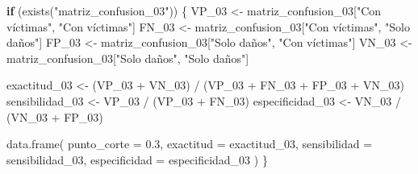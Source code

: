 \documentclass[
  11pt,
  letterpaper,
]{book}
\newenvironment{Shaded}{\begin{snugshade}}{\end{snugshade}}
\newcommand{\AttributeTok}[1]{\textcolor[rgb]{0.40,0.45,0.13}{#1}}
\newcommand{\ControlFlowTok}[1]{\textcolor[rgb]{0.00,0.23,0.31}{\textbf{#1}}}
\newcommand{\FloatTok}[1]{\textcolor[rgb]{0.68,0.00,0.00}{#1}}
\newcommand{\FunctionTok}[1]{\textcolor[rgb]{0.28,0.35,0.67}{#1}}
\newcommand{\NormalTok}[1]{\textcolor[rgb]{0.00,0.23,0.31}{#1}}
\newcommand{\OtherTok}[1]{\textcolor[rgb]{0.00,0.23,0.31}{#1}}
\newcommand{\SpecialCharTok}[1]{\textcolor[rgb]{0.37,0.37,0.37}{#1}}
\newcommand{\StringTok}[1]{\textcolor[rgb]{0.13,0.47,0.30}{#1}}
\begin{document}
\begin{Shaded}
\end{Shaded}

\begin{Shaded}
\begin{Highlighting}[]
\ControlFlowTok{if}\NormalTok{ (}\FunctionTok{exists}\NormalTok{(}\StringTok{"matriz\_confusion\_03"}\NormalTok{)) \{}
\NormalTok{  VP\_03 }\OtherTok{\textless{}{-}}\NormalTok{ matriz\_confusion\_03[}\StringTok{"Con víctimas"}\NormalTok{, }\StringTok{"Con víctimas"}\NormalTok{]}
\NormalTok{  FN\_03 }\OtherTok{\textless{}{-}}\NormalTok{ matriz\_confusion\_03[}\StringTok{"Con víctimas"}\NormalTok{, }\StringTok{"Solo daños"}\NormalTok{]}
\NormalTok{  FP\_03 }\OtherTok{\textless{}{-}}\NormalTok{ matriz\_confusion\_03[}\StringTok{"Solo daños"}\NormalTok{, }\StringTok{"Con víctimas"}\NormalTok{]}
\NormalTok{  VN\_03 }\OtherTok{\textless{}{-}}\NormalTok{ matriz\_confusion\_03[}\StringTok{"Solo daños"}\NormalTok{, }\StringTok{"Solo daños"}\NormalTok{]}

\NormalTok{  exactitud\_03 }\OtherTok{\textless{}{-}}\NormalTok{ (VP\_03 }\SpecialCharTok{+}\NormalTok{ VN\_03) }\SpecialCharTok{/}\NormalTok{ (VP\_03 }\SpecialCharTok{+}\NormalTok{ FN\_03 }\SpecialCharTok{+}\NormalTok{ FP\_03 }\SpecialCharTok{+}\NormalTok{ VN\_03)}
\NormalTok{  sensibilidad\_03 }\OtherTok{\textless{}{-}}\NormalTok{ VP\_03 }\SpecialCharTok{/}\NormalTok{ (VP\_03 }\SpecialCharTok{+}\NormalTok{ FN\_03)}
\NormalTok{  especificidad\_03 }\OtherTok{\textless{}{-}}\NormalTok{ VN\_03 }\SpecialCharTok{/}\NormalTok{ (VN\_03 }\SpecialCharTok{+}\NormalTok{ FP\_03)}

  \FunctionTok{data.frame}\NormalTok{(}
    \AttributeTok{punto\_corte =} \FloatTok{0.3}\NormalTok{,}
    \AttributeTok{exactitud =}\NormalTok{ exactitud\_03,}
    \AttributeTok{sensibilidad =}\NormalTok{ sensibilidad\_03,}
    \AttributeTok{especificidad =}\NormalTok{ especificidad\_03}
\NormalTok{  )}
\NormalTok{\}}
\end{Highlighting}
\end{Shaded}
\end{document}
